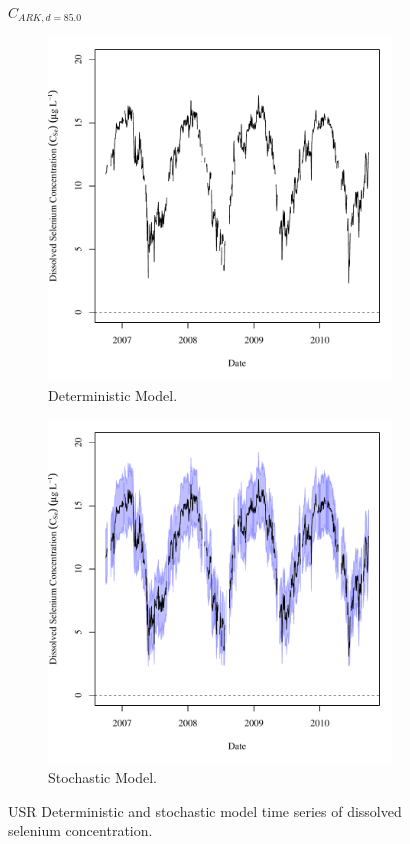 \subfiguremid
\begin{landscape}
	\begin{figure}
		$ C_{ARK,d=85.0} $
		\begin{subfigure}{0.7\textwidth}
			\centering
			\includegraphics[width=\tableCustomSize]{"Figures/Results_USR/Deterministic/c TS CON"}
			\caption{Deterministic Model.}
		\end{subfigure}%
		\begin{subfigure}{0.7\textwidth}
			\centering
			\includegraphics[width=\tableCustomSize]{"Figures/Results_USR/Stochastic/c TS CON"}
			\caption{Stochastic Model.}
		\end{subfigure}
		\caption{USR Deterministic and stochastic model time series of dissolved selenium concentration.}
	\end{figure}
\end{landscape}

